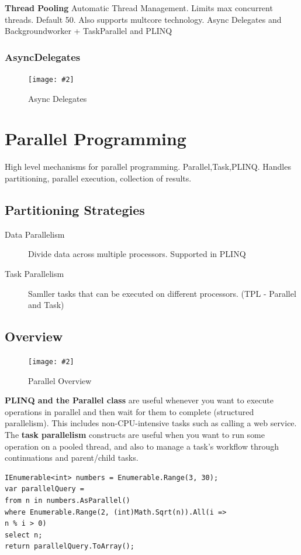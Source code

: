 \documentclass[a4paper,10pt]{scrartcl}
\newcommand{\pic}[2][Figure]{
  \begin{figure}[h!]
   \centering
   \texttt{[image: \#2]}
   \caption{{#1}}
  \end{figure}
}
\begin{document}
\textbf{Thread Pooling}
Automatic Thread Management. Limits max concurrent threads. Default 50. Also supports multcore technology. Async Delegates and Backgroundworker + TaskParallel and PLINQ

\subsubsection{AsyncDelegates}
\pic[Async Delegates]{asdel.png}

\section{Parallel Programming}
High level mechanisms for parallel programming. Parallel,Task,PLINQ.
 Handles partitioning, parallel execution, collection of results.
 
\subsection{Partitioning Strategies}
\begin{description}
 \item [Data Parallelism] Divide data across multiple processors. Supported in PLINQ
 \item [Task Parallelism] Samller tasks that can be executed on different processors. (TPL - Parallel and Task)
 
\end{description}

\subsection{Overview}
\pic[Parallel Overview]{paralleloverview.png}
\textbf{ PLINQ and the Parallel class} are useful whenever you want to execute
operations in parallel and then wait for them to complete
(structured parallelism). This includes non-CPU-intensive tasks such as
calling a web service.
 The \textbf{task parallelism} constructs are useful when you want to run some
operation on a pooled thread, and also to manage a task’s workflow
through continuations and parent/child tasks.

\begin{lstlisting}[caption=PLINQ Example]
IEnumerable<int> numbers = Enumerable.Range(3, 30);
var parallelQuery =
from n in numbers.AsParallel()
where Enumerable.Range(2, (int)Math.Sqrt(n)).All(i =>
n % i > 0)
select n;
return parallelQuery.ToArray();
 
\end{lstlisting}
\end{document}
